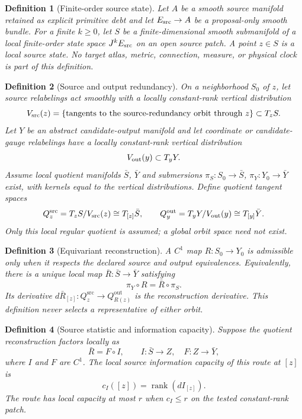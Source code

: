 \documentclass[11pt]{article}
\newtheorem{definition}{Definition}
\newcommand{\rank}{\operatorname{rank}}
\newcommand{\QS}{Q^{\mathrm{src}}}
\newcommand{\QY}{Q^{\mathrm{out}}}
\begin{document}
\begin{definition}[Finite-order source state]
Let \(A\) be a smooth source manifold retained as explicit primitive debt and
let \(E_{\rm src}\to A\) be a proposal-only smooth bundle.  For a finite
\(k\geq 0\), let \(S\) be a finite-dimensional smooth submanifold of a local
finite-order state space \(J^kE_{\rm src}\) on an open source patch.  A point
\(z\in S\) is a local source state.  No target atlas, metric, connection,
measure, or physical clock is part of this definition.
\end{definition}

\begin{definition}[Source and output redundancy]
On a neighborhood \(S_0\) of \(z\), let source relabelings act smoothly with a
locally constant-rank vertical distribution
\[
 V_{\rm src}(z)=\{\text{tangents to the source-redundancy orbit through }z\}
 \subset T_zS .
\]
Let \(Y\) be an abstract candidate-output manifold and let coordinate or
candidate-gauge relabelings have a locally constant-rank vertical distribution
\[
 V_{\rm out}(y)\subset T_yY .
\]
Assume local quotient manifolds \(\bar S\), \(\bar Y\) and submersions
\(\pi_S:S_0\to\bar S\), \(\pi_Y:Y_0\to\bar Y\) exist, with kernels equal to the
vertical distributions.  Define quotient tangent spaces
\[
 \QS_z=T_zS/V_{\rm src}(z)\cong T_{[z]}\bar S,\qquad
 \QY_y=T_yY/V_{\rm out}(y)\cong T_{[y]}\bar Y .
\]
Only this local regular quotient is assumed; a global orbit space need not
exist.
\end{definition}

\begin{definition}[Equivariant reconstruction]
A \(C^1\) map \(R:S_0\to Y_0\) is admissible only when it respects the declared
source and output equivalences.  Equivalently, there is a unique local map
\(\bar R:\bar S\to\bar Y\) satisfying
\[
 \pi_Y\circ R=\bar R\circ\pi_S .
\]
Its derivative \(d\bar R_{[z]}:\QS_z\to\QY_{R(z)}\) is the reconstruction
derivative.  This definition never selects a representative of either orbit.
\end{definition}

\begin{definition}[Source statistic and information capacity]
Suppose the quotient reconstruction factors locally as
\[
 \bar R=F\circ I,\qquad
 I:\bar S\to Z,\quad F:Z\to\bar Y ,
\]
where \(I\) and \(F\) are \(C^1\).  The local source information capacity of
this route at \([z]\) is
\[
 c_I([z])=\rank(dI_{[z]}).
\]
The route has local capacity at most \(r\) when \(c_I\leq r\) on the tested
constant-rank patch.
\end{definition}
\end{document}
